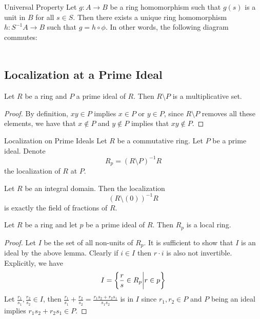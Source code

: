 \documentclass[a4paper]{article}
\begin{document}
\begin{thm}{Universal Property}{} Let $g:A\to B$ be a ring homomorphism such that $g(s)$ is a unit in $B$ for all $s\in S$. Then there exists a unique ring homomorphism $h:S^{-1}A\to B$ such that $g=h\circ\phi$. In other words, the following diagram commutes: \\~\\
\end{thm}

\subsection{Localization at a Prime Ideal}
\begin{lmm}{}{} Let $R$ be a ring and $P$ a prime ideal of $R$. Then $R\setminus P$ is a multiplicative set. \tcbline
\begin{proof}
By definition, $xy\in P$ implies $x\in P$ or $y\in P$, since $R\setminus P$ removes all these elements, we have that $x\notin P$ and $y\notin P$ implies that $xy\notin P$. 
\end{proof}
\end{lmm}

\begin{defn}{Localization on Prime Ideals}{} Let $R$ be a commutative ring. Let $P$ be a prime ideal. Denote $$R_p=(R\setminus P)^{-1}R$$ the localization of $R$ at $P$. 
\end{defn}

\begin{lmm}{}{} Let $R$ be an integral domain. Then the localization $$(R\setminus(0))^{-1}R$$ is exactly the field of fractions of $R$. 
\end{lmm}

\begin{prp}{}{} Let $R$ be a ring and let $p$ be a prime ideal of $R$. Then $R_p$ is a local ring. \tcbline
\begin{proof}
Let $I$ be the set of all non-units of $R_p$. It is sufficient to show that $I$ is an ideal by the above lemma. Clearly if $i\in I$ then $r\cdot i$ is also not invertible. Explicitly, we have $$I=\left\{\frac{r}{s}\in R_p\bigg{|}r\in p\right\}$$ Let $\frac{r_1}{s_1},\frac{r_2}{s_2}\in I$, then $\frac{r_1}{s_1}+\frac{r_2}{s_2}=\frac{r_1s_2+r_2s_1}{s_1s_2}$ is in $I$ since $r_1,r_2\in P$ and $P$ being an ideal implies $r_1s_2+r_2s_1\in P$. 
\end{proof}
\end{prp}
\end{document}
